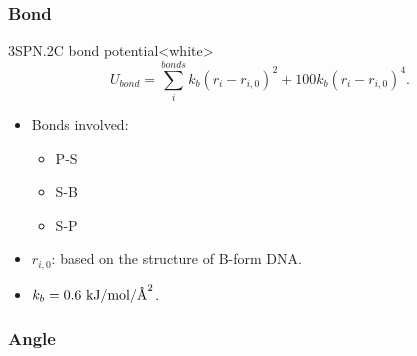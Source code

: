 \subsubsection{Bond}
\label{sec:dna_3spn2c_potential_bond}

\begin{smallpage}{3SPN.2C bond potential}<white>
  \begin{equation}
    \label{eq:dna_3spn2c_local_bond}
    U_{bond} = \sum_{i}^{bonds} k_b (r_i - r_{i,0})^2 + 100 k_b (r_i - r_{i,0})^4.
  \end{equation}
  \tcblower
  \begin{itemize}
  \item Bonds involved:
    \begin{itemize}
    \item P-S
    \item S-B
    \item S-P
    \end{itemize}
  \item $r_{i, 0}$: based on the structure of B-form DNA.
  \item $k_b = 0.6\ \mathrm{kJ/mol/\angstrom^2}$.
  \end{itemize}
\end{smallpage}



\subsubsection{Angle}
\label{sec:dna_3spn2c_potential_angle}

